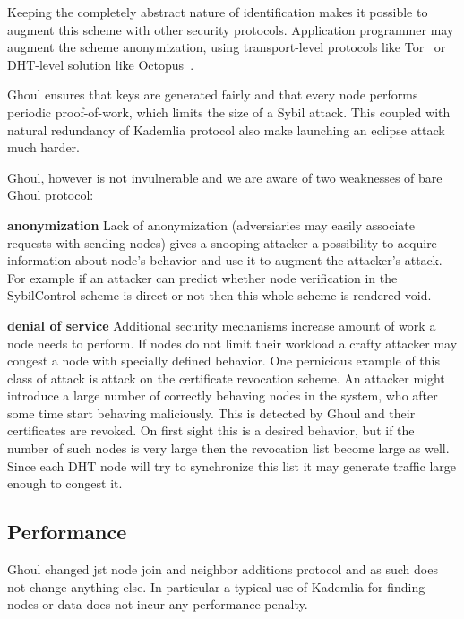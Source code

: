   Keeping the completely abstract nature of identification makes it possible to
  augment this scheme with other security protocols. Application programmer may
  augment the scheme anonymization, using transport-level protocols like 
  Tor~\cite{syv04} or DHT-level solution like Octopus~\cite{wan12b}.

  Ghoul ensures that keys are generated fairly and that every node performs
  periodic proof-of-work, which limits the size of a Sybil attack. This coupled
  with natural redundancy of Kademlia protocol also make launching an eclipse
  attack much harder.

  Ghoul, however is not invulnerable and we are aware of two weaknesses of
  bare Ghoul protocol:

  \begin{description}
    \item{\textbf{anonymization}} Lack of anonymization (adversiaries may easily
      associate requests with sending nodes) gives a snooping attacker a
      possibility to acquire information about node's behavior and use it to
      augment the attacker's attack.
      For example if an attacker can predict whether node verification in the
      SybilControl scheme is direct or not then this whole scheme is rendered
      void.
    \item{\textbf{denial of service}} Additional security mechanisms increase
      amount of work a node needs to perform.
      If nodes do not limit their workload a crafty attacker may congest a node
      with specially defined behavior.
      One pernicious example of this class of attack is attack on the
      certificate revocation scheme.
      An attacker might introduce a large number of correctly
      behaving nodes in the system, who after some time start behaving
      maliciously. This is detected by Ghoul and their certificates are
      revoked.
      On first sight this is a desired behavior, but if the number of such nodes
      is very large then the revocation list become large as well.
      Since each DHT node will try to synchronize this list it may generate
      traffic large enough to congest it.
  \end{description}

  \subsection{Performance}

  Ghoul changed jst node join and neighbor additions protocol and as
  such does not change anything else.
  In particular a typical use of Kademlia for finding nodes or data does not
  incur any performance penalty.

